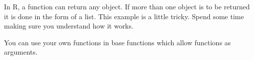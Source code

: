 \documentclass[titlepage]{book}\usepackage{knitr}
\begin{document}
In R, a function can return any object. If more than one object is to be returned it is done in the form of a list. This example is a little tricky.  Spend some time making sure you understand how it works.
\begin{knitrout}
\color{fgcolor}\begin{kframe}
\begin{alltt}
 \hlkwb{<-} \hlstd{(} \hlstd{=} \hlstd{(}\hlstd{,} \hlstd{,} \hlstd{),}  \hlstd{=} \hlstd{(}\hlstd{,} \hlstd{,} \hlstd{),}  \hlstd{=} \hlstd{(}\hlstd{,} \hlstd{,} \hlstd{),}\hlstd{=}\hlstd{)\{}
    \hlkwb{<-}  \hlopt{==} 
    \hlkwb{<-}  \hlopt{==} 
    \hlkwb{<-}  \hlopt{==} 
    \hlkwb{<-} \hlstd{(}       
 \hlstd{\}}
 \hlkwb{<-} \hlstd{(}\hlstd{,} \hlstd{,} \hlstd{)}
 \hlkwb{<-} \hlstd{(}\hlstd{,} \hlstd{,} \hlstd{)}
 \hlkwb{<-} \hlstd{(}\hlstd{,} \hlstd{,} \hlstd{)}
 \hlkwb{<-} \hlstd{=}\hlstd{(}\hlstd{,}\hlstd{,}\hlstd{))}
\end{alltt}
\end{kframe}
\end{knitrout}

You can use your own functions in base functions which allow functions as arguments.
\end{document}
